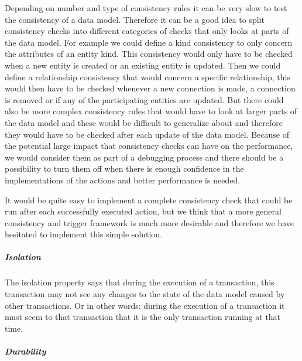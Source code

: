 Depending on number and type of consistency rules it can be very slow
to test the consistency of a data model. Therefore it can be a good
idea to split consistency checks into different categories of checks
that only looks at parts of the data model. For example we could define
a kind consistency to only concern the attributes of an entity kind.
This consistency would only have to be checked when a new entity is
created or an existing entity is updated. Then we could define a relationship
consistency that would concern a specific relationship, this would
then have to be checked whenever a new connection is made, a connection
is removed or if any of the participating entities are updated. But
there could also be more complex consistency rules that would have
to look at larger parts of the data model and these would be difficult
to generalize about and therefore they would have to be checked after
each update of the data model. Because of the potential large impact
that consistency checks can have on the performance, we would consider
them as part of a debugging process and there should be a possibility
to turn them off when there is enough confidence in the implementations
of the actions and better performance is needed. 

It would be quite easy to implement a complete consistency check that
could be run after each successfully executed action, but we think
that a more general consistency and trigger framework is much more
desirable and therefore we have hesitated to implement this simple
solution.


\subparagraph{Isolation}

The isolation property says that during the execution of a transaction,
this transaction may not see any changes to the state of the data
model caused by other transactions. Or in other words: during the
execution of a transaction it must seem to that transaction that it
is the only transaction running at that time.


\subparagraph{Durability}

